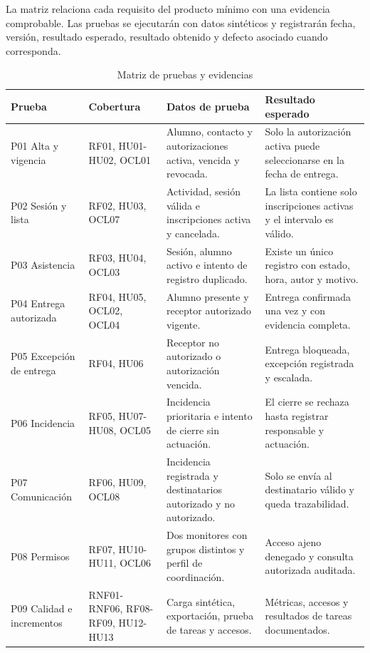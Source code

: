 La matriz relaciona cada requisito del producto mínimo con una evidencia comprobable. Las pruebas se ejecutarán con datos sintéticos y registrarán fecha, versión, resultado esperado, resultado obtenido y defecto asociado cuando corresponda.

\begin{table}[H]
\centering\small
\begin{tabularx}{\textwidth}{>{\hsize=0.747\hsize\raggedright\arraybackslash}X>{\hsize=0.747\hsize\raggedright\arraybackslash}X>{\hsize=1.231\hsize\raggedright\arraybackslash}X>{\hsize=1.275\hsize\raggedright\arraybackslash}X}
\toprule
\rowcolor{cabeceratabla} \textbf{Prueba} & \textbf{Cobertura} & \textbf{Datos de prueba} & \textbf{Resultado esperado} \\
\midrule
P01 Alta y vigencia & RF01, HU01-HU02, OCL01 & Alumno, contacto y autorizaciones activa, vencida y revocada. & Solo la autorización activa puede seleccionarse en la fecha de entrega. \\
P02 Sesión y lista & RF02, HU03, OCL07 & Actividad, sesión válida e inscripciones activa y cancelada. & La lista contiene solo inscripciones activas y el intervalo es válido. \\
P03 Asistencia & RF03, HU04, OCL03 & Sesión, alumno activo e intento de registro duplicado. & Existe un único registro con estado, hora, autor y motivo. \\
P04 Entrega autorizada & RF04, HU05, OCL02, OCL04 & Alumno presente y receptor autorizado vigente. & Entrega confirmada una vez y con evidencia completa. \\
P05 Excepción de entrega & RF04, HU06 & Receptor no autorizado o autorización vencida. & Entrega bloqueada, excepción registrada y escalada. \\
P06 Incidencia & RF05, HU07-HU08, OCL05 & Incidencia prioritaria e intento de cierre sin actuación. & El cierre se rechaza hasta registrar responsable y actuación. \\
P07 Comunicación & RF06, HU09, OCL08 & Incidencia registrada y destinatarios autorizado y no autorizado. & Solo se envía al destinatario válido y queda trazabilidad. \\
P08 Permisos & RF07, HU10-HU11, OCL06 & Dos monitores con grupos distintos y perfil de coordinación. & Acceso ajeno denegado y consulta autorizada auditada. \\
P09 Calidad e incrementos & RNF01-RNF06, RF08-RF09, HU12-HU13 & Carga sintética, exportación, prueba de tareas y accesos. & Métricas, accesos y resultados de tareas documentados. \\
\bottomrule
\end{tabularx}
\caption{Matriz de pruebas y evidencias}\label{tab:39}
\end{table}

